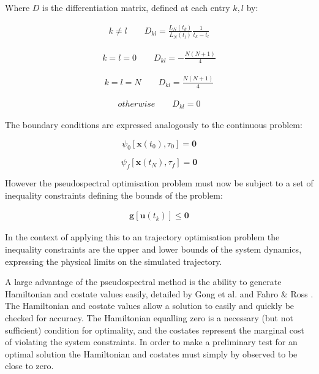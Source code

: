 Where $D$ is the differentiation matrix, defined at each entry $k,l$ by:

\begin{eqnarray}
k \neq l\qquad
D_{kl} = \frac{L_N(t_k)}{L_N(t_l)} \frac{1}{t_k - t_l}
\end{eqnarray}

\begin{eqnarray}
k = l = 0\qquad
D_{kl} = - \frac{N(N+1)}{4} 
\end{eqnarray}

\begin{eqnarray}
k = l = N\qquad
D_{kl} = \frac{N(N+1)}{4} 
\end{eqnarray}

\begin{eqnarray}
otherwise \qquad
D_{kl} = 0
\end{eqnarray}

The boundary conditions are expressed analogously to the continuous problem:

\begin{equation}
\psi_0[\textbf{x}(t_0), \tau_0] = \textbf{0}
\end{equation}

\begin{equation}
\psi_f[\textbf{x}(t_N), \tau_f] = \textbf{0}
\end{equation}

However the pseudospectral optimisation problem must now be subject to a set of inequality constraints defining the bounds of the problem:

\begin{eqnarray}
\textbf{g}[\textbf{u}(t_k)] \leq \textbf{0}
\end{eqnarray}

In the context of applying this to an trajectory optimisation problem the inequality constraints are the upper and lower bounds of the system dynamics, expressing the physical limits on the simulated trajectory. 

A large advantage of the pseudospectral method is the ability to generate Hamiltonian and costate values easily, detailed by Gong et al. \cite{Gong2010} and Fahro \& Ross \cite{Fahroo2001}. The Hamiltonian and costate values allow a solution to easily and quickly be checked for accuracy.  The Hamiltonian equalling zero is a necessary (but not sufficient) condition for optimality, and the costates represent the marginal cost of violating the system constraints. In order to make a preliminary test for an optimal solution the Hamiltonian and costates must simply by observed to be close to zero. 


